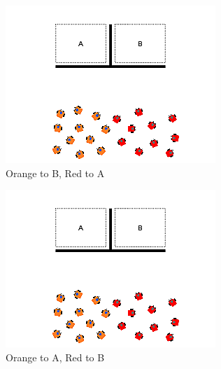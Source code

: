 \documentclass[]{article}
\begin{document}
\begin{figure}
\begin{subfigure}{0.42\textwidth}
		\includegraphics[width=\linewidth]{slide_images/Swarm_Robot_Control_-_10_Robot_0011.png}
		\caption{Orange to B, Red to A}
		\label{fig:sub1}
	\end{subfigure}%
	\begin{subfigure}{0.42\textwidth}
		\centering
		\includegraphics[width=\linewidth]{slide_images/Swarm_Robot_Control_-_10_Robot_0013.png}
		\caption{Orange to A, Red to B}
		\label{fig:sub2}
	\end{subfigure}
	\begin{subfigure}{0.42\textwidth}
		\centering

\end{subfigure}
\end{figure}
\end{document}
